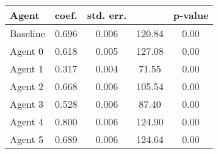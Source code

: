    \begin{tabular}{l c c S c }
    \toprule
    
    Agent & coef. & std. err. &  & p-value \\
    
    \midrule
    Baseline & 0.696 &      0.006 &    120.84 &      0.00\\ 
    Agent 0 & 0.618  &     0.005  &   127.08  &     0.00\\ 
    Agent 1 & 0.317  &    0.004   &   71.55   &    0.00 \\
    Agent 2 & 0.668  &     0.006  &   105.54  &     0.00\\ 
    Agent 3 & 0.528  &     0.006  &    87.40  &     0.00\\ 
    Agent 4 & 0.800  &     0.006  &   124.90  &     0.00\\ 
    Agent 5 & 0.689  &     0.006  &   124.64  &     0.00\\ 
    
    
    \bottomrule
        
    \end{tabular}